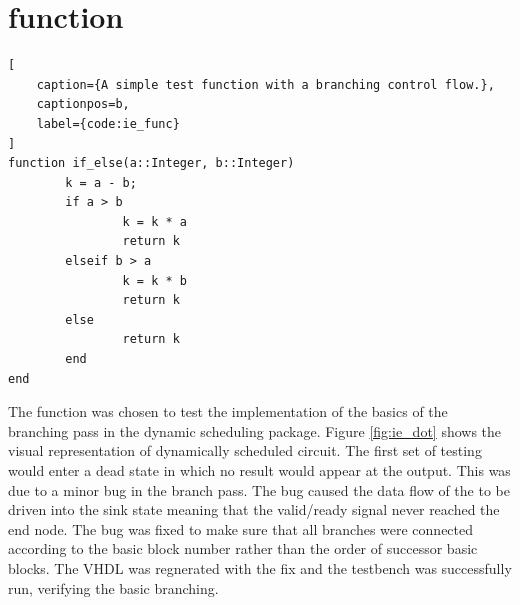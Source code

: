 \pagebreak

\section{ function}
\label{sec:ie}

\begin{lstlisting}[
    caption={A simple test function with a branching control flow.},
    captionpos=b, 
    label={code:ie_func}
]
function if_else(a::Integer, b::Integer)
        k = a - b;
        if a > b
                k = k * a
                return k
        elseif b > a
                k = k * b
                return k
        else
                return k
        end
end
\end{lstlisting}

The  function was chosen to test the implementation of the basics of the branching pass in the dynamic scheduling package. Figure \ref{fig:ie_dot} shows the visual representation of dynamically scheduled circuit. The first set of testing would enter a dead state in which no result would appear at the output. This was due to a minor bug in the branch pass. The bug caused the data flow of the  to be driven into the sink state meaning that the valid/ready signal never reached the end node. The bug was fixed to make sure that all branches were connected according to the basic block number rather than the order of successor basic blocks. The VHDL was regnerated with the fix and the testbench was successfully run, verifying the basic branching.

\pagebreak

